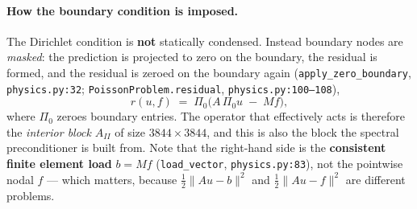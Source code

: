 \documentclass[11pt]{article}
\begin{document}
\paragraph{How the boundary condition is imposed.}
The Dirichlet condition is \textbf{not} statically condensed. Instead boundary nodes are
\emph{masked}: the prediction is projected to zero on the boundary, the residual is formed, and
the residual is zeroed on the boundary again (\texttt{apply\_zero\_boundary},
\texttt{physics.py:32}; \texttt{PoissonProblem.residual}, \texttt{physics.py:100--108}),
\begin{equation*}
  r(u,f) \;=\; \Pi_0\big(A\,\Pi_0 u \;-\; M f\big),
\end{equation*}
where $\Pi_0$ zeroes boundary entries. The operator that effectively acts is therefore the
\emph{interior block} $A_{II}$ of size $3844 \times 3844$, and this is also the block the spectral
preconditioner is built from. Note that the right-hand side is the \textbf{consistent finite
element load} $b = Mf$ (\texttt{load\_vector}, \texttt{physics.py:83}), not the pointwise nodal
$f$ --- which matters, because $\tfrac12\|Au-b\|^2$ and $\tfrac12\|Au - f\|^2$ are different
problems.
\end{document}
